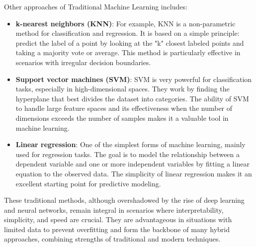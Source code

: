 \documentclass[12pt]{article}
\begin{document}
Other approaches of Traditional Machine Learning includes:
\begin{itemize}
    \item \textbf{k-nearest neighbors (KNN)}: For example, KNN is a non-parametric method for classification and regression. It is based on a simple principle: predict the label of a point by looking at the "k" closest labeled points and taking a majority vote or average. This method is particularly effective in scenarios with irregular decision boundaries.

    \item \textbf{Support vector machines (SVM)}: SVM is very powerful for classification tasks, especially in high-dimensional spaces. They work by finding the hyperplane that best divides the dataset into categories. The ability of SVM to handle large feature spaces and its effectiveness when the number of dimensions exceeds the number of samples makes it a valuable tool in machine learning.

    \item \textbf{Linear regression}: One of the simplest forms of machine learning, mainly used for regression tasks. The goal is to model the relationship between a dependent variable and one or more independent variables by fitting a linear equation to the observed data. The simplicity of linear regression makes it an excellent starting point for predictive modeling.
\end{itemize}
These traditional methods, although overshadowed by the rise of deep learning and neural networks, remain integral in scenarios where interpretability, simplicity, and speed are crucial. They are advantageous in situations with limited data to prevent overfitting and form the backbone of many hybrid approaches, combining strengths of traditional and modern techniques.
\end{document}
